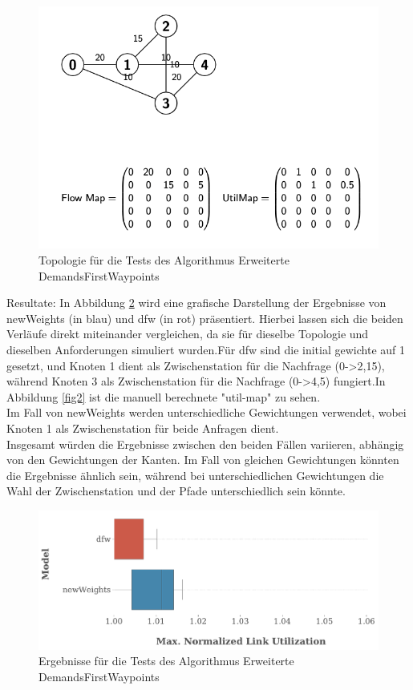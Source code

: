 \documentclass[sigconf, nonacm, review]{acmart}
\begin{document}
\begin{figure}
\centering
\includegraphics[width=\linewidth]{figures/3.png}
\caption{Topologie für die Tests des Algorithmus Erweiterte DemandsFirstWaypoints }
\label{fig3}
\end{figure}

Resultate: In Abbildung \ref{fig4} wird eine grafische Darstellung der Ergebnisse von newWeights (in blau) und dfw (in rot) präsentiert. Hierbei lassen sich die beiden Verläufe direkt miteinander vergleichen, da sie für dieselbe Topologie und dieselben Anforderungen simuliert wurden.Für dfw sind die initial gewichte auf 1 gesetzt, und Knoten 1 dient als Zwischenstation für die Nachfrage (0->2,15), während Knoten 3 als Zwischenstation für die Nachfrage (0->4,5) fungiert.In Abbildung \ref{fig2} ist die manuell berechnete "util-map" zu sehen.\\
Im Fall von newWeights werden unterschiedliche Gewichtungen verwendet, wobei Knoten 1 als Zwischenstation für beide Anfragen dient.\\
Insgesamt würden die Ergebnisse zwischen den beiden Fällen variieren, abhängig von den Gewichtungen der Kanten. Im Fall von gleichen Gewichtungen könnten die Ergebnisse ähnlich sein, während bei unterschiedlichen Gewichtungen die Wahl der Zwischenstation und der Pfade unterschiedlich sein könnte.

\begin{figure}
\centering
\includegraphics[width=\linewidth]{figures/batch_result001.pdf}
\caption{Ergebnisse für die Tests des Algorithmus Erweiterte DemandsFirstWaypoints }
\label{fig4}
\end{figure}
\end{document}
